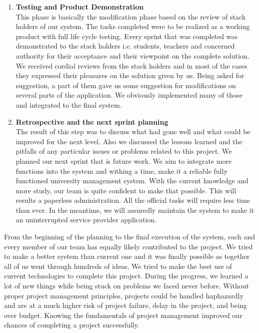 \begin{enumerate}
\item \textbf{Testing and Product Demonstration}\\

This phase is basically the modification phase based on the review of stack holders of our system. The tasks completed were to be realized as a working product with full life cycle testing. Every sprint that was completed was demonstrated to the stack holders i.e. students, teachers and concerned authority for their acceptance and their viewpoint on the complete solution. We received cordial reviews from the stack holders and in most of the cases they expressed their pleasures on the solution given by us. Being asked for suggestion, a part of them gave us some suggestion for modifications on several parts of the application. We obviously implemented many of those and integrated to the final system.

\item \textbf{Retrospective and the next sprint planning}\\

The result of this step was to discuss what had gone well and what could be improved for the next level. Also we discussed the lessons learned and the pitfalls of any particular issues or problems related to this project. We planned our next sprint that is future work. We aim to integrate more functions into the system and withing a time, make it a reliable fully functioned university management system. With the current knowledge and more study, our team is quite confident to make that possible. This will results a paperless administration. All the official tasks will require less time than ever. In the meantime, we will assuredly maintain the system to make it an uninterrupted service provider application.


\end{enumerate}

From the beginning of the planning to the final execution of the system, each and every member of our team has equally likely contributed to the project. We tried to make a better system than current one and it was finally possible as together all of us went through hundreds of ideas. We tried to make the best use of current technologies to complete this project. During the progress, we learned a lot of new things while being stuck on problems we faced never before. Without proper project management principles, projects could be handled haphazardly and are at a much higher risk of project failure, delay in the project, and being over budget. Knowing the fundamentals of project management improved our chances of completing a project successfully. 

